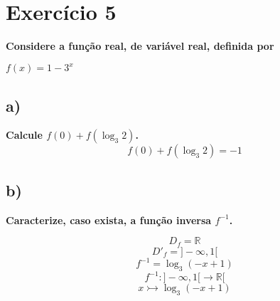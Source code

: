 \documentclass[a4paper]{article}
\begin{document}
\section*{Exercício 5}\textbf{Considere a função real, de variável real, definida por}
\begin{center}
	\textbf{$f(x) = 1 - 3^x$	}
\end{center}
\subsection*{a)}\textbf{Calcule $f(0) + f(\log_{3}2)$.}
\[f(0) + f(\log_{3}2)=-1\]
\subsection*{b)}\textbf{Caracterize, caso exista, a função inversa $f^{-1}$.}

\[D_{f}=\mathbb{R}\]
\[D'_{f}=]-\infty,1[\]
\[f^{-1}=\log_{3}\left(-x+1\right)\]
\[f^{-1}:]-\infty,1[\rightarrow\mathbb{R}[\]
\[x\rightarrowtail \log_{3}\left(-x+1\right)\]
\end{document}
